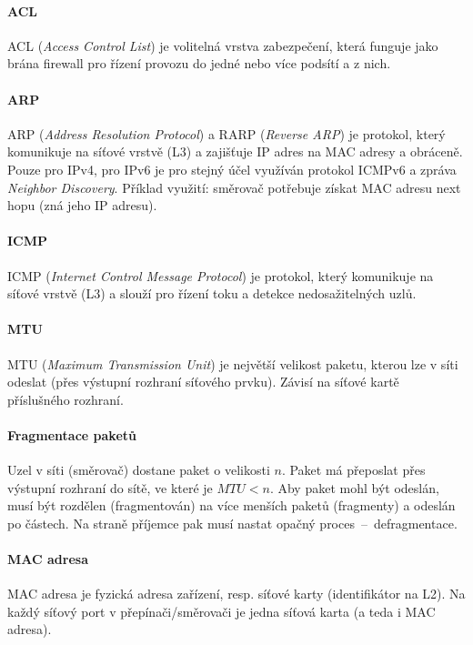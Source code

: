 \paragraph*{ACL} ACL (\textit{Access Control List}) je volitelná vrstva zabezpečení, která funguje jako brána firewall pro řízení provozu do jedné nebo více podsítí a z nich.

\paragraph*{ARP} ARP (\textit{Address Resolution Protocol}) a RARP (\textit{Reverse ARP}) je protokol, který komunikuje na síťové vrstvě (L3) a zajišťuje  IP adres na MAC adresy a obráceně. Pouze pro IPv4, pro IPv6 je pro stejný účel využíván protokol ICMPv6 a zpráva \textit{Neighbor Discovery}. Příklad využití: směrovač potřebuje získat MAC adresu next hopu (zná jeho IP adresu).

\paragraph*{ICMP} ICMP (\textit{Internet Control Message Protocol}) je protokol, který komunikuje na síťové vrstvě (L3) a slouží pro řízení toku a detekce nedosažitelných uzlů.

\paragraph*{MTU} MTU (\textit{Maximum Transmission Unit}) je největší velikost paketu, kterou lze v síti odeslat (přes výstupní rozhraní síťového prvku). Závisí na síťové kartě příslušného rozhraní.

\paragraph*{Fragmentace paketů} Uzel v síti (směrovač) dostane paket o velikosti $n$. Paket má přeposlat přes výstupní rozhraní do sítě, ve které je $MTU < n$. Aby paket mohl být odeslán, musí být rozdělen (fragmentován) na více menších paketů (fragmenty) a odeslán po částech. Na straně příjemce pak musí nastat opačný proces~--~defragmentace.

\paragraph*{MAC adresa} MAC adresa je fyzická adresa zařízení, resp. síťové karty (identifikátor na L2). Na každý síťový port v přepínači/směrovači je jedna síťová karta (a teda i MAC adresa).

